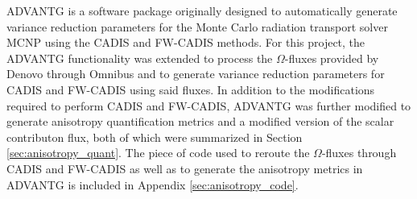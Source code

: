 ADVANTG \cite{mosher_new_2010} is a software package
originally designed to automatically
generate variance reduction
parameters for the Monte Carlo radiation transport solver
MCNP \cite{brown_mcnp_2002}
using the CADIS
and FW-CADIS methods. For this project, the ADVANTG functionality was extended to
process the $\Omega$-fluxes provided by Denovo through Omnibus and to generate
variance reduction
parameters for CADIS and FW-CADIS using said fluxes. In addition to the
modifications required to perform CADIS and FW-CADIS, ADVANTG was further modified
to generate anisotropy quantification metrics and a modified version of
the scalar contributon flux, both of which were summarized in
Section \ref{sec:anisotropy_quant}. The piece of code used to
reroute the $\Omega$-fluxes
through CADIS and FW-CADIS as well as to generate the anisotropy metrics in
ADVANTG is included in Appendix \ref{sec:anisotropy_code}.
